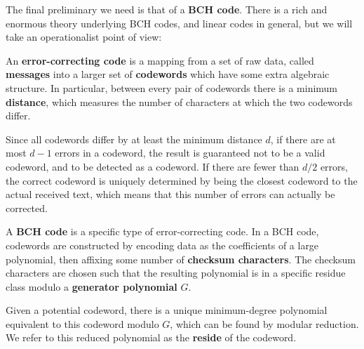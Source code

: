 \documentclass[letterpaper]{article}
\theoremstyle{xxx}
\theoremstyle{evil}
\theoremstyle{yyy}
\theoremstyle{plain}
\theoremstyle{zzz}
\begin{document}
The final preliminary we need is that of a \textbf{BCH code}. There is a
rich and enormous theory underlying BCH codes, and linear codes in general,
but we will take an operationalist point of view:

An \textbf{error-correcting code} is a mapping from a set of raw data, called
\textbf{messages} into a larger set of \textbf{codewords} which have
some extra algebraic structure. In particular, between every pair of
codewords there is a minimum \textbf{distance}, which measures the
number of characters at which the two codewords differ.

Since all codewords differ by at least the minimum distance $d$, if there
are at most $d-1$ errors in a codeword, the result is guaranteed not to
be a valid codeword, and to be detected as a codeword. If there are fewer
than $d/2$ errors, the correct codeword is uniquely determined by being
the closest codeword to the actual received text, which means that this
number of errors can actually be corrected.

A \textbf{BCH code} is a specific type of error-correcting code. In a BCH
code, codewords are constructed by encoding data as the coefficients of a
large polynomial, then affixing some number of \textbf{checksum characters}.
The checksum characters are chosen such that the resulting polynomial is in
a specific residue class modulo a \textbf{generator polynomial} $G$.

Given a potential codeword, there is a unique minimum-degree polynomial
equivalent to this codeword modulo $G$, which can be found by modular
reduction. We refer to this reduced polynomial as the \textbf{reside}
of the codeword.
\end{document}
